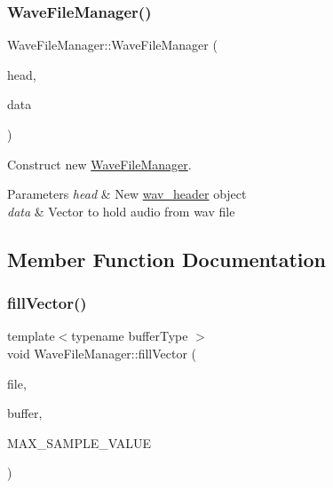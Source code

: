 \subsubsection{\texorpdfstring{Wave\+File\+Manager()}{WaveFileManager()}}
{\footnotesize\ttfamily Wave\+File\+Manager\+::\+Wave\+File\+Manager (\begin{DoxyParamCaption}\item[{\hyperlink{structwav__header}{wav\+\_\+header}}]{head,  }\item[{std\+::vector$<$ float $>$}]{data }\end{DoxyParamCaption})\hspace{0.3cm}{\ttfamily [inline]}}



Construct new \hyperlink{classWaveFileManager}{Wave\+File\+Manager}. 


\begin{DoxyParams}{Parameters}
{\em head} & New \hyperlink{structwav__header}{wav\+\_\+header} object\\
\hline
{\em data} & Vector to hold audio from wav file \\
\hline
\end{DoxyParams}


\subsection{Member Function Documentation}
\mbox{\label{classWaveFileManager_a8bda282f8ec75af81b27d53b3d4b6da2}} 
\subsubsection{\texorpdfstring{fill\+Vector()}{fillVector()}}
{\footnotesize\ttfamily template$<$typename buffer\+Type $>$ \\
void Wave\+File\+Manager\+::fill\+Vector (\begin{DoxyParamCaption}\item[{std\+::ifstream \&}]{file,  }\item[{buffer\+Type}]{buffer,  }\item[{const int}]{M\+A\+X\+\_\+\+S\+A\+M\+P\+L\+E\+\_\+\+V\+A\+L\+UE }\end{DoxyParamCaption})\hspace{0.3cm}{\ttfamily [inline]}}



